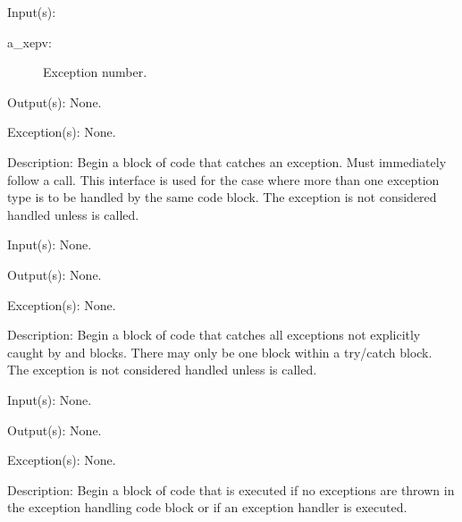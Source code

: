 \begin{capi}
\begin{capilist}
	\end{capilist}
\label{xep_mcatch}
	\begin{capilist}
	\item[Input(s): ]
		\begin{description}\item[]
		\item[a\_xepv: ]
			Exception number.
		\end{description}
	\item[Output(s): ] None.
	\item[Exception(s): ] None.
	\item[Description: ]
		Begin a block of code that catches an exception.  Must
		immediately follow a  call.  This interface
		is used for the case where more than one exception type is to be
		handled by the same code block.  The exception is not considered
		handled unless  is called.
	\end{capilist}
\label{xep_acatch}
	\begin{capilist}
	\item[Input(s): ] None.
	\item[Output(s): ] None.
	\item[Exception(s): ] None.
	\item[Description: ]
		Begin a block of code that catches all exceptions not explicitly
		caught by  and \cppmacro{xep\_mcatch}{}
		blocks.  There may only be one  block within
		a try/catch block.  The exception is not considered handled
		unless  is called.
	\end{capilist}
\label{xep_finally}
	\begin{capilist}
	\item[Input(s): ] None.
	\item[Output(s): ] None.
	\item[Exception(s): ] None.
	\item[Description: ]
		Begin a block of code that is executed if no exceptions are
		thrown in the exception handling code block or if an exception
		handler is executed.
	\end{capilist}
\label{xep_value}
	\begin{capilist}

\end{capilist}
\end{capi}
